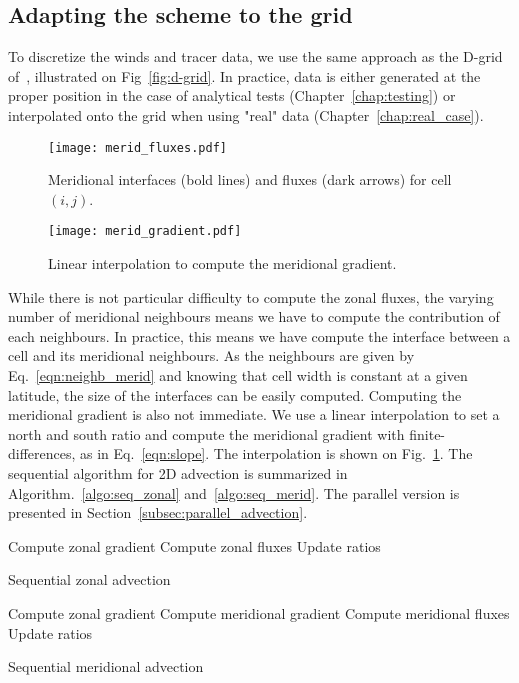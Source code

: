 \subsection{Adapting the scheme to the grid}
To discretize the winds and tracer data, we use the same approach as the D-grid
of~\cite{Arakawa1977}, illustrated on Fig~\ref{fig:d-grid}. In practice, data is
either generated at the proper position in the case of analytical tests
(Chapter~\ref{chap:testing}) or interpolated onto the grid when using "real" data
(Chapter~\ref{chap:real_case}).
\begin{figure}
  \begin{minipage}[t]{0.48\linewidth} 
    \centering
    \texttt{[image: merid\_fluxes.pdf]}
    \caption{ Meridional interfaces (bold lines) and fluxes (dark arrows) for
    cell $(i,j)$.}
    \label{fig:merid_fluxes}
  \end{minipage}
  \hfill
  \begin{minipage}[t]{0.48\linewidth} 
    \centering
    \texttt{[image: merid\_gradient.pdf]}
    \caption{Linear interpolation to compute the meridional gradient.}
    \label{fig:merid_interpol}
  \end{minipage}
\end{figure}

While there is not particular difficulty to compute the zonal fluxes, the varying
number of meridional neighbours means we have to compute the contribution of
each neighbours. In practice, this means we have compute the interface between a
cell and its meridional neighbours. As the neighbours are given by
Eq.~\eqref{eqn:neighb_merid} and knowing that cell width is constant at a given
latitude, the size of the interfaces can be easily computed.
Computing the meridional gradient is also not immediate. We use a linear
interpolation to set a north and south ratio and compute the meridional gradient
with finite-differences, as in Eq.~\eqref{eqn:slope}. The interpolation is shown on
Fig.~\ref{fig:merid_interpol}.
The sequential algorithm for 2D advection is summarized in
Algorithm.~\ref{algo:seq_zonal} and~\ref{algo:seq_merid}. The parallel version is
presented in Section~\ref{subsec:parallel_advection}.
\begin{algorithm}
  \begin{algorithmic}[1]
    \State Compute zonal gradient 
    \State Compute zonal fluxes 
    \State Update ratios
  \end{algorithmic}
  \caption{Sequential zonal advection}
  \label{algo:seq_zonal}
\end{algorithm}
\begin{algorithm}
  \begin{algorithmic}[1]
    \State Compute zonal gradient 
    \State Compute meridional gradient 
    \State Compute meridional fluxes 
    \State Update ratios
  \end{algorithmic}
  \caption{Sequential meridional advection}
  \label{algo:seq_merid}
\end{algorithm}


